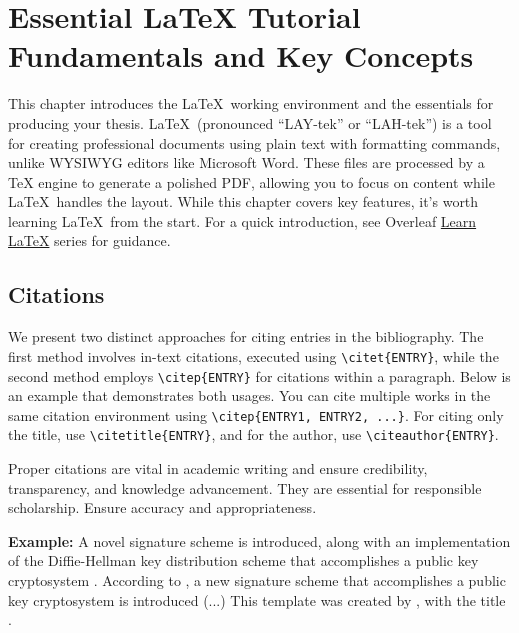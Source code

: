 \chapter[Essential LaTeX Tutorial: Fundamentals and Key Concepts]{Essential LaTeX Tutorial Fundamentals and Key Concepts}
\label{cp:latex-tutorial}

This chapter introduces the \LaTeX~working environment and the essentials for producing your thesis. \LaTeX~(pronounced ``LAY-tek'' or ``LAH-tek'') is a tool for creating professional documents using plain text with formatting commands, unlike WYSIWYG editors like Microsoft Word. These files are processed by a TeX engine to generate a polished PDF, allowing you to focus on content while \LaTeX~handles the layout. While this chapter covers key features, it's worth learning \LaTeX~from the start. For a quick introduction, see Overleaf \href{https://www.overleaf.com/learn/latex/Learn_LaTeX_in_30_minutes}{Learn LaTeX} series for guidance.

\section{Citations}
\label{sec:citations}
We present two distinct approaches for citing entries in the bibliography. The first method involves in-text citations, executed using \verb|\citet{ENTRY}|, while the second method employs \verb|\citep{ENTRY}| for citations within a paragraph. Below is an example that demonstrates both usages. You can cite multiple works in the same citation environment using \verb|\citep{ENTRY1, ENTRY2, ...}|. For citing only the title, use \verb|\citetitle{ENTRY}|, and for the author, use \verb|\citeauthor{ENTRY}|.

\begin{block}[tip]
Proper citations are vital in academic writing and ensure credibility, transparency, and knowledge advancement. They are essential for responsible scholarship. Ensure accuracy and appropriateness.
\end{block}

\noindent\textbf{Example:} A novel signature scheme is introduced, along with an implementation of the Diffie-Hellman key distribution scheme that accomplishes a public key cryptosystem \citep{Elgamal1985}. According to \citet{Elgamal1985}, a new signature scheme that accomplishes a public key cryptosystem is introduced (...) This template was created by \citeauthor{IPLeiriaThesis}, with the title .

